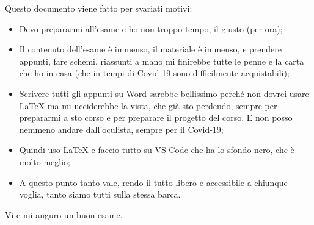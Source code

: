 \documentclass[../main]{subfiles}
\begin{document}
\mbox{}\newline
Questo documento viene fatto per svariati motivi:
\begin{itemize}
    \item Devo prepararmi all'esame e ho non troppo tempo, il giusto (per ora);
    \item Il contenuto dell'esame è immenso, il materiale è immenso, e prendere appunti, fare schemi, riassunti a mano mi finirebbe tutte le penne e la carta che ho in casa (che in tempi di Covid-19 sono difficilmente acquistabili);
    \item Scrivere tutti gli appunti su Word sarebbe bellissimo perché non dovrei usare \LaTeX{} ma mi ucciderebbe la vista, che già sto perdendo, sempre per prepararmi a sto corso e per preparare il progetto del corso. E non posso nemmeno andare dall'oculista, sempre per il Covid-19;
    \item Quindi uso \LaTeX{} e faccio tutto su VS Code che ha lo sfondo nero, che è molto meglio;
    \item A questo punto tanto vale, rendo il tutto libero e accessibile a chiunque voglia, tanto siamo tutti sulla stessa barca.
\end{itemize}
Vi e mi auguro un buon esame.
\end{document}
